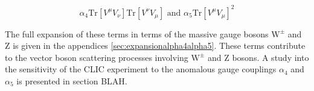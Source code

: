 \begin{equation}
\alpha_{4}\text{Tr}[V^{\mu}V_{\nu}]\text{Tr}[V^{\nu}V_{\mu}] \text{ and } \alpha_{5}\text{Tr}[V^{\mu}V_{\mu}]^{2}
\end{equation}

The full expansion of these terms in terms of the massive gauge bosons $\text{W}^{\pm}$ and Z is given in the appendices \ref{sec:expansionalpha4alpha5}.  These terms contribute to the vector boson scattering processes involving $\text{W}^{\pm}$ and Z bosons.  A study into the sensitivity of the CLIC experiment to the anomalous gauge couplings $\alpha_{4}$ and $\alpha_{5}$ is presented in section BLAH.


